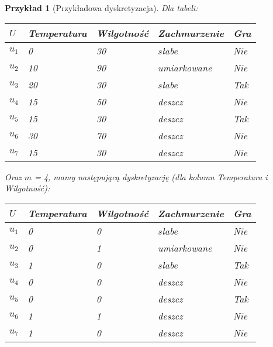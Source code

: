 \documentclass[magisterska]{pracamgr}
\theoremstyle{plain}
\newtheorem{przyklad}[thm]{Przykład}
\theoremstyle{definition}
\theoremstyle{remark}
\begin{document}
\begin{przyklad}[Przykładowa dyskretyzacja]
Dla tabeli:
\begin{center}
 \begin{tabular}{l || P{2.5cm} P{2.5cm} P{2.5cm} | P{1.5cm}}
  $U$     & Temperatura & Wilgotność & Zachmurzenie & Gra \\ 
  \hline
  $u_{1}$ & 0      & 30      & słabe          & Nie \\
  $u_{2}$ & 10     & 90      & umiarkowane    & Nie \\
  $u_{3}$ & 20     & 30      & słabe   	      & Tak \\
  $u_{4}$ & 15     & 50      & deszcz         & Nie \\
  $u_{5}$ & 15     & 30      & deszcz         & Tak \\
  $u_{6}$ & 30     & 70      & deszcz         & Nie \\
  $u_{7}$ & 15     & 30      & deszcz         & Nie \\
 \end{tabular}
\end{center}
Oraz $m$ = 4, mamy następującą dyskretyzację (dla kolumn Temperatura i Wilgotność):
\begin{center}
 \begin{tabular}{l || P{2.5cm} P{2.5cm} P{2.5cm} | P{1.5cm}}
  $U$     & Temperatura & Wilgotność & Zachmurzenie & Gra \\ 
  \hline
  $u_{1}$ & 0     & 0      & słabe          & Nie \\
  $u_{2}$ & 0     & 1      & umiarkowane    & Nie \\
  $u_{3}$ & 1     & 0      & słabe   	    & Tak \\
  $u_{4}$ & 0     & 0      & deszcz         & Nie \\
  $u_{5}$ & 0     & 0      & deszcz         & Tak \\
  $u_{6}$ & 1     & 1      & deszcz         & Nie \\
  $u_{7}$ & 1     & 0      & deszcz         & Nie \\
 \end{tabular}
\end{center}
\end{przyklad}
\end{document}
